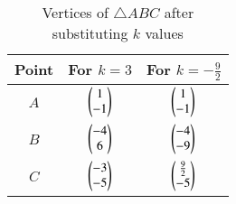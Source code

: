 \begin{table}[h!]
    \centering
    \begin{tabular}{|c|c|c|}
        \hline
        Point & For $k=3$ & For $k=-\tfrac{9}{2}$ \\
        \hline
        $A$ & $\begin{pmatrix}1\\-1\end{pmatrix}$ & $\begin{pmatrix}1\\-1\end{pmatrix}$ \\
$B$ & $\begin{pmatrix}-4\\6\end{pmatrix}$ & $\begin{pmatrix}-4\\-9\end{pmatrix}$ \\
$C$ & $\begin{pmatrix}-3\\-5\end{pmatrix}$ & $\begin{pmatrix}\tfrac{9}{2}\\-5\end{pmatrix}$ \\
        \hline
    \end{tabular}
    \caption{Vertices of $\triangle ABC$ after substituting $k$ values}
    \label{tab:triangle_values}
\end{table}
